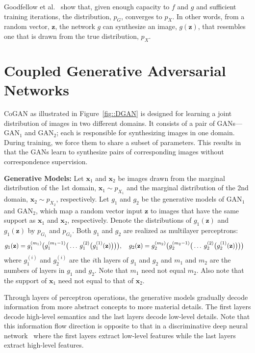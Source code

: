 Goodfellow et al.~\cite{goodfellow2014generative} show that, given enough capacity to $f$ and $g$ and sufficient training iterations, the distribution, $p_{G}$, converges to $p_{X}$. In other words, from a random vector, $\mathbf{z}$, the network $g$ can synthesize an image, $g(\mathbf{z})$, that resembles one that is drawn from the true distribution, $p_X$.

\section{Coupled Generative Adversarial Networks}\label{sec::dgan}

CoGAN as illustrated in Figure~\ref{fig::DGAN} is designed for learning a joint distribution of images in two different domains. It consists of a pair of GANs---$\text{GAN}_1$ and $\text{GAN}_2$; each is responsible for synthesizing images in one domain. During training, we force them to share a subset of parameters. This results in that the GANs learn to synthesize pairs of corresponding images without correspondence supervision. 

{\bf Generative Models: }
Let $\mathbf{x}_1$ and $\mathbf{x}_2$ be images drawn from the marginal distribution of the 1st domain, $\mathbf{x}_1\sim p_{X_1}$ and the marginal distribution of the 2nd domain, $\mathbf{x}_2\sim p_{X_2}$, respectively. Let $g_1$ and $g_2$ be the generative models of $\text{GAN}_1$ and $\text{GAN}_2$, which map a random vector input $\mathbf{z}$ to images that have the same support as $\mathbf{x}_1$ and $\mathbf{x}_2$, respectively. Denote the distributions of $g_1(\mathbf{z})$ and $g_1(\mathbf{z})$ by $p_{G_1}$ and $p_{G_2}$. Both $g_1$ and $g_2$ are realized as multilayer perceptrons: 
\begin{align}
& g_1(\mathbf{z}) = g_1^{(m_1)}\big{(}g_1^{(m_1-1)}\big{(}\ldots\medspace g_1^{(2)}\big{(}g_1^{(1)}(\mathbf{z})\big{)}\big{)}\big{)},\quad
g_2(\mathbf{z}) = g_2^{(m_2)}\big{(}g_2^{(m_2-1)}\big{(}\ldots\medspace g_2^{(2)}\big{(}g_2^{(1)}(\mathbf{z})\big{)}\big{)}\big{)}\nonumber
\end{align}
where $g_1^{(i)}$ and $g_2^{(i)}$ are the $i$th layers of $g_1$ and $g_2$ and $m_1$ and $m_2$ are the numbers of layers in $g_1$ and $g_2$. Note that $m_1$ need not equal $m_2$. Also note that the support of $\mathbf{x}_1$ need not equal to that of $\mathbf{x}_2$.

Through layers of perceptron operations, the generative models gradually decode information from more abstract concepts to more material details. The first layers decode high-level semantics and the last layers decode low-level details. Note that this information flow direction is opposite to that in a discriminative deep neural network~\cite{krizhevsky2012imagenet} where the first layers extract low-level features while the last layers extract high-level features. 

